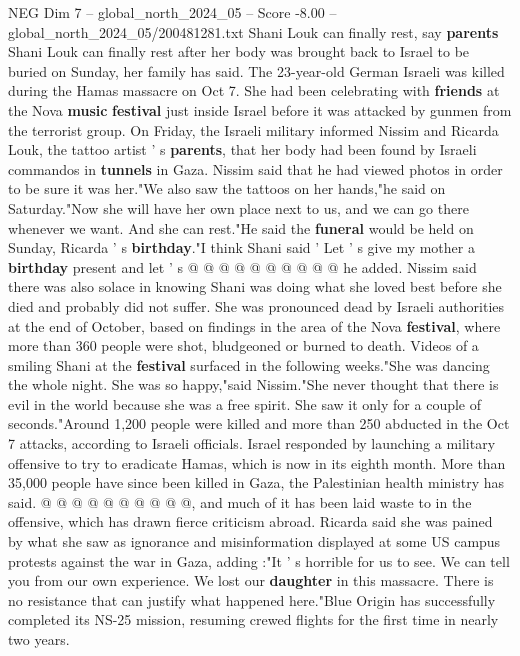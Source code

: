 \begin{textsample}{NEG Dim 7 – global\_north\_2024\_05 – Score -8.00 – global\_north\_2024\_05/200481281.txt}  \label{ex:f7_neg_189}
Shani Louk can finally rest, say \textbf{parents} Shani Louk can finally rest after her body was brought back to Israel to be buried on Sunday, her family has said.
The 23-year-old German Israeli was killed during the Hamas massacre on Oct 7.
She had been celebrating with \textbf{friends} at the Nova \textbf{music} \textbf{festival} just inside Israel before it was attacked by gunmen from the terrorist group.
On Friday, the Israeli military informed Nissim and Ricarda Louk, the tattoo artist ' s \textbf{parents}, that her body had been found by Israeli commandos in \textbf{tunnels} in Gaza.
Nissim said that he had viewed photos in order to be sure it was her."We also saw the tattoos on her hands,"he said on Saturday."Now she will have her own place next to us, and we can go there whenever we want.
And she can rest."He said the \textbf{funeral} would be held on Sunday, Ricarda ' s \textbf{birthday}."I think Shani said ' Let ' s give my mother a \textbf{birthday} present and let ' s @ @ @ @ @ @ @ @ @ @ he added.
Nissim said there was also solace in knowing Shani was doing what she loved best before she died and probably did not suffer.
She was pronounced dead by Israeli authorities at the end of October, based on findings in the area of the Nova \textbf{festival}, where more than 360 people were shot, bludgeoned or burned to death.
Videos of a smiling Shani at the \textbf{festival} surfaced in the following weeks."She was dancing the whole night.
She was so happy,"said Nissim."She never thought that there is evil in the world because she was a free spirit.
She saw it only for a couple of seconds."Around 1,200 people were killed and more than 250 abducted in the Oct 7 attacks, according to Israeli officials.
Israel responded by launching a military offensive to try to eradicate Hamas, which is now in its eighth month.
More than 35,000 people have since been killed in Gaza, the Palestinian health ministry has said. @ @ @ @ @ @ @ @ @ @, and much of it has been laid waste to in the offensive, which has drawn fierce criticism abroad.
Ricarda said she was pained by what she saw as ignorance and misinformation displayed at some US campus protests against the war in Gaza, adding :"It ' s horrible for us to see.
We can tell you from our own experience.
We lost our \textbf{daughter} in this massacre.
There is no resistance that can justify what happened here."Blue Origin has successfully completed its NS-25 mission, resuming crewed flights for the first time in nearly two years.

\end{textsample}
